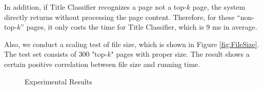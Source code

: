 In addition, if Title Classifier recognizes a page not a top-$k$ page,
the system directly returns without processing the page content.
Therefore, for these ``non-top-$k$'' pages, it only costs the time for Title Classifier,
which is 9 ms in average.


%
%
%
%

Also, we conduct a scaling test of file size,
which is shown in Figure \ref{fig:FileSize}.
The test set consists of 300 "top-$k$" pages with proper size.
The result shows a certain positive correlation between file size and running time.

\begin{figure*}[th]
\centering
{}
\caption{Experimental Results}
\label{fig:results}
\end{figure*}




